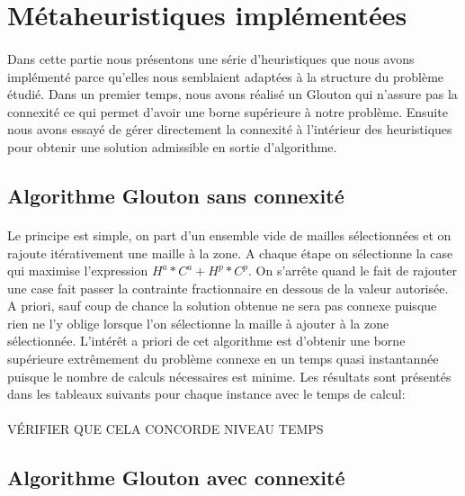 \documentclass[a4paper, 11pt]{article} %
\begin{document}
\section{Métaheuristiques implémentées}

\paragraph*{}
Dans cette partie nous présentons une série d'heuristiques que nous avons implémenté parce qu'elles nous semblaient adaptées à la structure du problème étudié. Dans un premier temps, nous avons réalisé un Glouton qui n'assure pas la connexité ce qui permet d'avoir une borne supérieure à notre problème. Ensuite nous avons essayé de gérer directement la connexité à l'intérieur des heuristiques pour obtenir une solution admissible en sortie d'algorithme.

\subsection{Algorithme Glouton sans connexité}

\paragraph*{}
Le principe est simple, on part d'un ensemble vide de mailles sélectionnées et on rajoute itérativement une maille à la zone. A chaque étape on sélectionne la case qui maximise l'expression $H^a*C^a+H^p*C^p$. On s'arrête quand le fait de rajouter une case fait passer la contrainte fractionnaire en dessous de la valeur autorisée. A priori, sauf coup de chance la solution obtenue ne sera pas connexe puisque rien ne l'y oblige lorsque l'on sélectionne la maille à ajouter à la zone sélectionnée. L'intérêt a priori de cet algorithme est d'obtenir une borne supérieure extrêmement du problème connexe en un temps quasi instantannée puisque le nombre de calculs nécessaires est minime. Les résultats sont présentés dans les tableaux suivants pour chaque instance avec le temps de calcul:

\paragraph*{}
VÉRIFIER QUE CELA CONCORDE NIVEAU TEMPS 


\subsection{Algorithme Glouton avec connexité}
\end{document}
